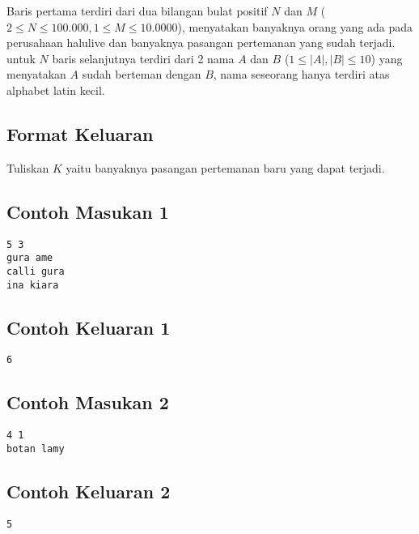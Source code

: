 \documentclass{article}
\begin{document}
Baris pertama terdiri dari dua bilangan bulat positif $N$ dan $M$ ($2 \leq N \leq 100.000,  1 \leq M \leq 10.0000$), menyatakan banyaknya orang yang ada pada perusahaan halulive dan banyaknya pasangan pertemanan yang sudah terjadi.
untuk $N$ baris selanjutnya terdiri dari 2 nama $A$ dan $B$ ($1 \leq |A|,|B| \leq 10$) yang menyatakan $A$ sudah berteman dengan $B$, nama seseorang hanya terdiri atas alphabet latin kecil.

\subsection*{Format Keluaran}

Tuliskan $K$ yaitu banyaknya pasangan pertemanan baru yang dapat terjadi.

\begin{multicols}{2}
\subsection*{Contoh Masukan 1}
\begin{lstlisting}
5 3
gura ame
calli gura
ina kiara
\end{lstlisting}
\columnbreak
\subsection*{Contoh Keluaran 1}
\begin{lstlisting}
6
\end{lstlisting}
\vfill
\null
\end{multicols}

\begin{multicols}{2}
\subsection*{Contoh Masukan 2}
\begin{lstlisting}
4 1
botan lamy
\end{lstlisting}
\columnbreak
\subsection*{Contoh Keluaran 2}
\begin{lstlisting}
5
\end{lstlisting}
\vfill
\null
\end{multicols}
\end{document}
